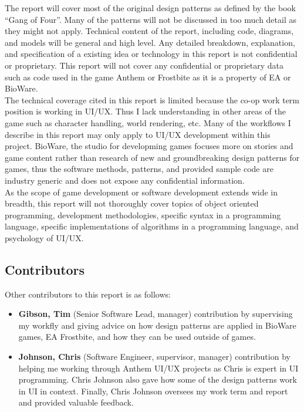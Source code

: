 The report will cover most of the original design patterns as defined by the book ``Gang of Four''\cite{gof}. Many of the patterns will not be discussed in too much detail as they might not apply. Technical content of the report, including code, diagrams, and models will be general and high level. Any detailed breakdown, explanation, and specification of a existing idea or technology in this report is not confidential or proprietary. This report will not cover any confidential or proprietary data such as code used in the game Anthem or Frostbite as it is a property of EA or BioWare.\bs
\\
The technical coverage cited in this report is limited because the co-op work term position is working in UI/UX. Thus I lack understanding in other areas of the game such as character handling, world rendering, etc. Many of the workflows I describe in this report may only apply to UI/UX development within this project. BioWare, the studio for developming games focuses more on stories and game content rather than research of new and groundbreaking design patterns for games, thus the software methods, patterns, and provided sample code are industry generic and does not expose any confidential information.\bs
\\
As the scope of game development or software development extends wide in breadth, this report will not thoroughly cover topics of object oriented programming, development methodologies, specific syntax in a programming language, specific implementations of algorithms in a programming language, and psychology of UI/UX. 

\subsection*{Contributors}

Other contributors to this report is as follows:

\begin{itemize}
	\item \textbf{Gibson, Tim} (Senior Software Lead, manager) contribution by supervising my workfly and giving advice on how design patterns are applied in BioWare games, EA Frostbite, and how they can be used outside of games.\\
	\item \textbf{Johnson, Chris} (Software Engineer, supervisor, manager) contribution by helping me working through Anthem UI/UX projects as Chris is expert in UI programming. Chris Johnson also gave how some of the design patterns work in UI in context. Finally, Chris Johnson oversees my work term and report and provided valuable feedback.
\end{itemize}

